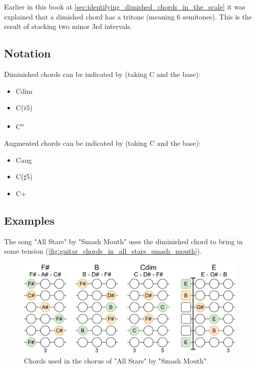 Earlier in this book at \autoref{sec:identifying_dimished_chords_in_the_scale} it was explained that a dimished chord has a tritone (meaning 6 semitones). This is the result of stacking two minor 3rd intervals.


\subsection{Notation}
\begin{minipage}{0.4\textwidth}
	Diminished chords can be indicated by (taking C and the base):
	
	\begin{itemize}
		\item Cdim
		\item C($\flat$5)
		\item C\textsuperscript{o}
	\end{itemize}
\end{minipage}
\hfill
\begin{minipage}{0.4\textwidth}
	Augmented chords can be indicated by (taking C and the base):
	
	\begin{itemize}
		\item Caug
		\item C($\sharp$5)
		\item C+
	\end{itemize}
\end{minipage}

\newpage

\subsection{Examples}


The song "All Stars" by "Smash Mouth" uses the diminished chord to bring in some tension (\autoref{fig:guitar_chords_in_all_stars_smash_mouth}).
 
\begin{figure}[h]
	\centering
	\includegraphics[height=0.16\textheight]{../../Images/ChordsInChorusAllStarsSmashMouth.png}
	\caption{Chords used in the chorus of "All Stars" by "Smash Mouth"}
	\label{fig:guitar_chords_in_all_stars_smash_mouth}
\end{figure}

